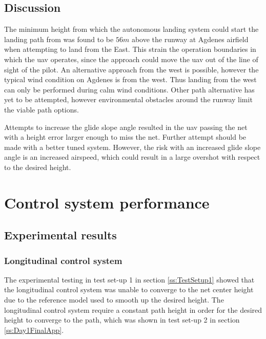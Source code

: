 \subsection{Discussion}
The minimum height from which the autonomous landing system could start the landing path from was found to be $56 m$ above the runway at Agdenes airfield when attempting to land from the East. This strain the operation boundaries in which the \gls{uav} operates, since the approach could move the \gls{uav} out of the line of sight of the pilot. An alternative approach from the west is possible, however the typical wind condition on Agdenes is from the west. Thus landing from the west can only be performed during calm wind conditions. Other path alternative has yet to be attempted, however environmental obstacles around the runway limit the viable path options.

Attempts to increase the glide slope angle resulted in the \gls{uav} passing the net with a height error larger enough to miss the net. Further attempt should be made with a better tuned system. However, the risk with an increased glide slope angle is an increased airspeed, which could result in a large overshot with respect to the desired height.
\section{Control system performance}\label{ss:EvaluationControl}
\subsection{Experimental results}
\subsubsection{Longitudinal control system}
The experimental testing in test set-up 1 in section \ref{ss:TestSetup1} showed that the longitudinal control system was unable to converge to the net center height due to the reference model used to smooth up the desired height. The longitudinal control system require a constant path height in order for the desired height to converge to the path, which was shown in test set-up 2 in section \ref{ss:Day1FinalApp}.

